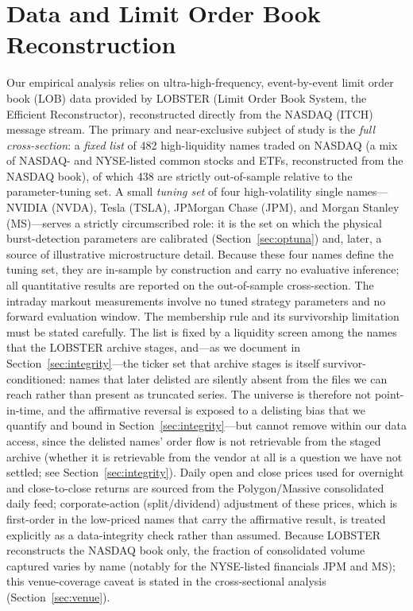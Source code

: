 \documentclass[11pt]{article}
\begin{document}
\section{Data and Limit Order Book Reconstruction}
\label{sec:data}
Our empirical analysis relies on ultra-high-frequency, event-by-event limit order book (LOB) data provided by LOBSTER (Limit Order Book System, the Efficient Reconstructor), reconstructed directly from the NASDAQ (ITCH) message stream. The primary and near-exclusive subject of study is the \emph{full cross-section}: a \emph{fixed list} of 482 high-liquidity names traded on NASDAQ (a mix of NASDAQ- and NYSE-listed common stocks and ETFs, reconstructed from the NASDAQ book), of which 438 are strictly out-of-sample relative to the parameter-tuning set. A small \emph{tuning set} of four high-volatility single names---NVIDIA (NVDA), Tesla (TSLA), JPMorgan Chase (JPM), and Morgan Stanley (MS)---serves a strictly circumscribed role: it is the set on which the physical burst-detection parameters are calibrated (Section~\ref{sec:optuna}) and, later, a source of illustrative microstructure detail. Because these four names define the tuning set, they are in-sample by construction and carry no evaluative inference; all quantitative results are reported on the out-of-sample cross-section. The intraday markout measurements involve no tuned strategy parameters and no forward evaluation window. The membership rule and its survivorship limitation must be stated carefully. The list is fixed by a liquidity screen among the names that the LOBSTER archive stages, and---as we document in Section~\ref{sec:integrity}---the ticker set that archive stages is itself survivor-conditioned: names that later delisted are silently absent from the files we can reach rather than present as truncated series. The universe is therefore not point-in-time, and the affirmative reversal is exposed to a delisting bias that we quantify and bound in Section~\ref{sec:integrity}---but cannot remove within our data access, since the delisted names' order flow is not retrievable from the staged archive (whether it is retrievable from the vendor at all is a question we have not settled; see Section~\ref{sec:integrity}). Daily open and close prices used for overnight and close-to-close returns are sourced from the Polygon/Massive consolidated daily feed; corporate-action (split/dividend) adjustment of these prices, which is first-order in the low-priced names that carry the affirmative result, is treated explicitly as a data-integrity check rather than assumed. Because LOBSTER reconstructs the NASDAQ book only, the fraction of consolidated volume captured varies by name (notably for the NYSE-listed financials JPM and MS); this venue-coverage caveat is stated in the cross-sectional analysis (Section~\ref{sec:venue}).
\end{document}
